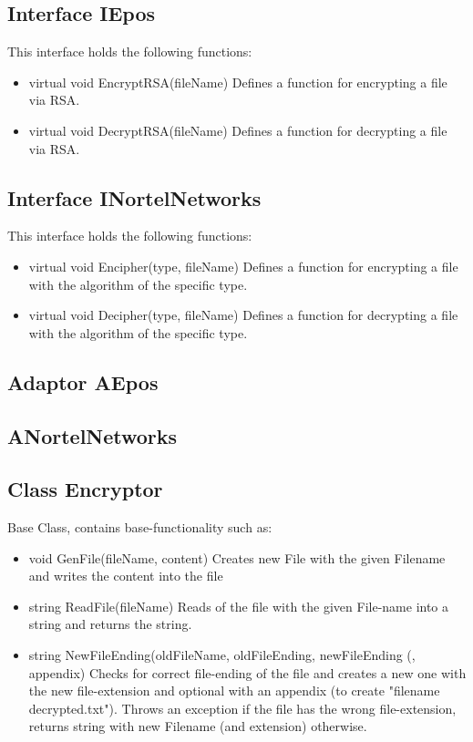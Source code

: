 \subsection{Interface IEpos}
This interface holds the following functions:
\begin{itemize}
\item virtual  void EncryptRSA(fileName)
\subitem Defines a function for encrypting a file via RSA.
\item virtual void DecryptRSA(fileName)
\subitem Defines a function for decrypting a file via RSA.
\end{itemize}

\subsection{Interface INortelNetworks}
This interface holds the following functions:
\begin{itemize}
\item virtual  void Encipher(type, fileName)
\subitem Defines a function for encrypting a file with the algorithm of the specific type.
\item virtual void Decipher(type, fileName)
\subitem Defines a function for decrypting a file with the algorithm of the specific type.
\end{itemize}

\subsection{Adaptor AEpos}
\subsection{ANortelNetworks}

\subsection{Class Encryptor}
Base Class, contains base-functionality such as:
\begin{itemize}
\item void GenFile(fileName, content)
\subitem Creates new File with the given Filename and writes the content into the file

\item string ReadFile(fileName)
\subitem Reads of the file with the given File-name into a string and returns the string.

\item string NewFileEnding(oldFileName, oldFileEnding, newFileEnding (, appendix)
\subitem Checks for correct file-ending of the file and creates a new one with the new file-extension and optional with an appendix (to create "filename decrypted.txt"). Throws an exception if the file has the wrong file-extension, returns string with new Filename (and extension) otherwise.
\end{itemize}

